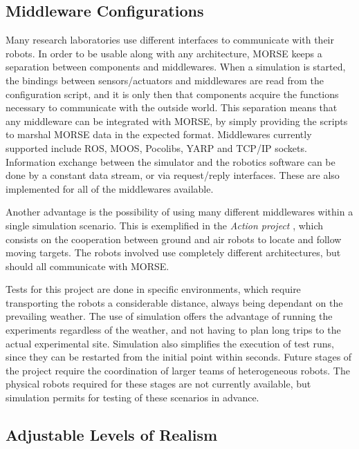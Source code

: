 \documentclass{llncs}
\begin{document}
\subsection {Middleware Configurations}
\label{section:middlewares}

Many research laboratories use different interfaces to communicate with their
robots. In order to be usable along with any architecture, MORSE keeps a
separation between components and middlewares.  When a simulation is started,
the bindings between sensors/actuators and middlewares are read from the
configuration script, and it is only then that components acquire the functions
necessary to communicate with the outside world.
This separation means that any middleware can be integrated with MORSE, by
simply providing the scripts to marshal MORSE data in the expected format.
Middlewares currently supported include ROS, MOOS, Pocolibs, YARP and
TCP/IP sockets.
Information exchange between the simulator and the robotics software can be
done by a constant data stream, or via request/reply interfaces. These are also
implemented for all of the middlewares available.

Another advantage is the possibility of using many different middlewares within
a single simulation scenario. This is exemplified in the \emph{Action project}
\cite{6106782}, which consists on the cooperation between ground
and air robots to locate and follow moving targets.
The robots involved use completely different architectures, but should all
communicate with MORSE.

Tests for this project are done in specific environments, which require
transporting the robots a considerable distance, always being dependant on the
prevailing weather.  The use of
simulation offers the advantage of running the experiments regardless of the
weather, and not having to plan long trips to the actual experimental site.
Simulation also simplifies the execution of test runs, since they can be
restarted from the initial point within seconds.  Future stages of the project
require the coordination of larger teams of heterogeneous robots. The physical
robots required for these stages are not currently available, but simulation
permits for testing of these scenarios in advance.


\subsection{Adjustable Levels of Realism}
\label{section:realism}
\end{document}
